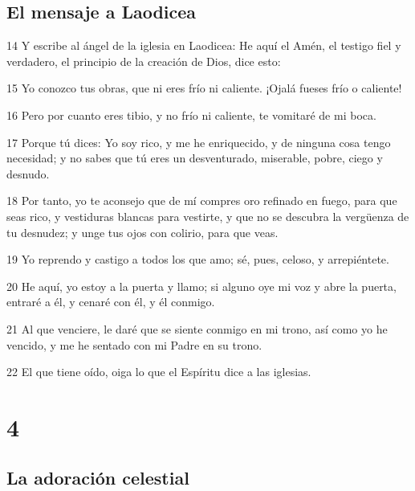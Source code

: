 \section*{El mensaje a Laodicea}

\par 14 Y escribe al ángel de la iglesia en Laodicea: He aquí el Amén, el testigo fiel y verdadero, el principio de la creación de Dios, dice esto:
\par 15 Yo conozco tus obras, que ni eres frío ni caliente. ¡Ojalá fueses frío o caliente!
\par 16 Pero por cuanto eres tibio, y no frío ni caliente, te vomitaré de mi boca.
\par 17 Porque tú dices: Yo soy rico, y me he enriquecido, y de ninguna cosa tengo necesidad; y no sabes que tú eres un desventurado, miserable, pobre, ciego y desnudo.
\par 18 Por tanto, yo te aconsejo que de mí compres oro refinado en fuego, para que seas rico, y vestiduras blancas para vestirte, y que no se descubra la vergüenza de tu desnudez; y unge tus ojos con colirio, para que veas.
\par 19 Yo reprendo y castigo a todos los que amo; sé, pues, celoso, y arrepiéntete.
\par 20 He aquí, yo estoy a la puerta y llamo; si alguno oye mi voz y abre la puerta, entraré a él, y cenaré con él, y él conmigo.
\par 21 Al que venciere, le daré que se siente conmigo en mi trono, así como yo he vencido, y me he sentado con mi Padre en su trono.
\par 22 El que tiene oído, oiga lo que el Espíritu dice a las iglesias.

\chapter{4}

\section*{La adoración celestial}

